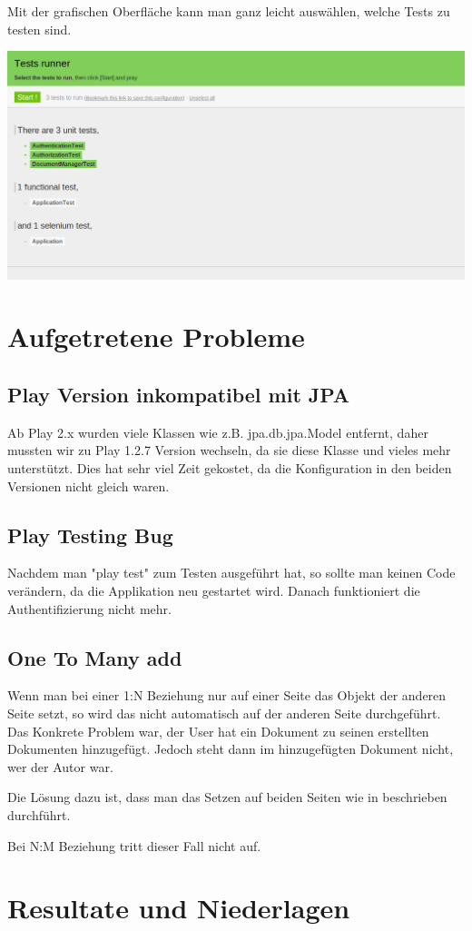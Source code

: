 \documentclass[11pt, a4paper]{article}
\begin{document}
Mit der grafischen Oberfläche kann man ganz leicht auswählen, welche Tests zu testen sind.

\includegraphics[width=\textwidth]{pic/play-test}

\section{Aufgetretene Probleme}
\subsection{Play Version inkompatibel mit JPA}
Ab Play 2.x wurden viele Klassen wie z.B. jpa.db.jpa.Model entfernt, daher mussten wir zu Play 1.2.7 Version wechseln, da sie diese Klasse und vieles mehr unterstützt. Dies hat sehr viel Zeit gekostet, da die Konfiguration in den beiden Versionen nicht gleich waren. 
\subsection{Play Testing Bug}
Nachdem man "play test" zum Testen ausgeführt hat, so sollte man keinen Code verändern, da die Applikation neu gestartet wird. Danach funktioniert die Authentifizierung nicht mehr.
\subsection{One To Many add}
Wenn man bei einer 1:N Beziehung nur auf einer Seite das Objekt der anderen Seite setzt, so wird das nicht automatisch auf der anderen Seite durchgeführt. Das Konkrete Problem war, der User hat ein Dokument zu seinen erstellten Dokumenten hinzugefügt. Jedoch steht dann im hinzugefügten Dokument nicht, wer der Autor war.

Die Lösung dazu ist, dass man das Setzen auf beiden Seiten wie in %
beschrieben durchführt.

Bei N:M Beziehung tritt dieser Fall nicht auf.

\section{Resultate und Niederlagen}
% 
\end{document}

